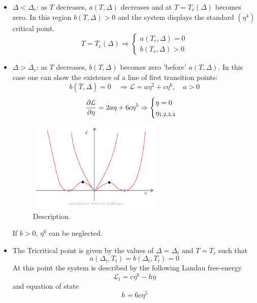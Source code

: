 \documentclass[../main/main.tex]{subfiles}
\begin{document}
\begin{itemize}
\item \( \Delta < \Delta _c \): as \( T \) decreases, \( a(T,\Delta ) \) decreases and at \( T = T_c (\Delta ) \) becomes zero. In this region \( b(T,\Delta ) >0 \) and the system displays the standard \( (\eta ^4) \) critical point.
\begin{equation}
  T = T_c (\Delta ) \Rightarrow \begin{cases}
    a (T_c,\Delta ) = 0 \\
    b (T_c,\Delta ) > 0
\end{cases}
\end{equation}
\item \( \Delta > \Delta _c \): as \( T \) decreases, \( b(T,\Delta ) \) becomes zero 'before' \( a(T,\Delta ) \). In this case one can show the existence of a line of first transition points:
\begin{equation}
  b (\bar{T},\Delta  ) = 0 \quad \Rightarrow   \mathcal{L} = a \eta ^2 + c \eta ^6, \quad a>0
\end{equation}
\begin{equation}
  \pdv{\mathcal{L}}{\eta } = 2 a \eta + 6 c \eta ^5 \Rightarrow \begin{cases}
    \eta =0 \\
    \eta _{1,2,3,4}
  \end{cases}
\end{equation}

\begin{figure}[h!]
\centering
\includegraphics[width=0.6\textwidth]{../lessons/16_image/7.pdf}
\caption{\label{fig:16_7} Description.}
\end{figure}

If \( b>0 \), \( \eta ^6 \) can be neglected.
\item The Tricritical point is given by the values of \( \Delta = \Delta _t \)  and \( T= T_c \) such that
\begin{equation}
  a (\Delta _t, T_t) = b (\Delta _t, T_t) = 0
\end{equation}
At this point the system is described by the following Landau free-energy
\begin{equation}
  \mathcal{L}_t = c \eta ^6 - h \eta
\end{equation}
and equation of state
\begin{equation}
  h = 6 c \eta ^5
\end{equation}


\end{itemize}
\end{document}
